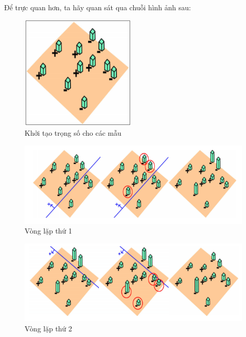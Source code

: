 \documentclass[12pt,a4paper]{article}
\begin{document}
Để trực quan hơn, ta hãy quan sát qua chuỗi hình ảnh sau:
\begin{center}
    \begin{figure}[htp]
    \begin{center}
    \includegraphics[scale=0.8]{Images/1}
    \end{center}
    \caption{Khởi tạo trọng số cho các mẫu}
    \end{figure}
\end{center}
\begin{center}
    \begin{figure}[htp]
    \begin{center}
    \includegraphics[scale=0.8]{Images/2}
    \end{center}
    \caption{Vòng lặp thứ 1}
    \end{figure}
\end{center}
\begin{center}
    \begin{figure}[htp]
    \begin{center}
    \includegraphics[scale=0.8]{Images/3}
    \end{center}
    \caption{Vòng lặp thứ 2}
    \end{figure}
\end{center}
\end{document}
